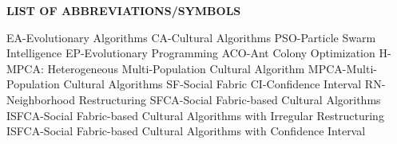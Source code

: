 \newpage
{}
\begin{center}
	\textbf{\textbf{LIST OF ABBREVIATIONS/SYMBOLS}}
\end{center}
EA-Evolutionary Algorithms\newline\newline
CA-Cultural Algorithms\newline\newline
PSO-Particle Swarm Intelligence\newline\newline
EP-Evolutionary Programming\newline\newline
ACO-Ant Colony Optimization\newline\newline
H-MPCA: Heterogeneous Multi-Population Cultural Algorithm\newline\newline
MPCA-Multi-Population Cultural Algorithms\newline\newline
SF-Social Fabric\newline\newline
CI-Confidence Interval\newline\newline
RN-Neighborhood Restructuring\newline\newline
SFCA-Social Fabric-based Cultural Algorithms\newline\newline
ISFCA-Social Fabric-based Cultural Algorithms with Irregular Restructuring\newline\newline
ISFCA-Social Fabric-based Cultural Algorithms with Confidence Interval
%
